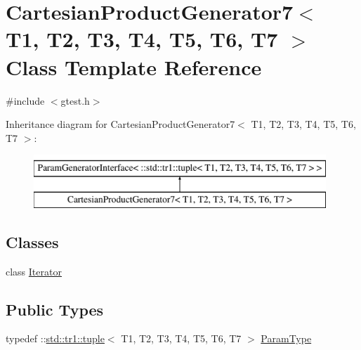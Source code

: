 \hypertarget{classtesting_1_1internal_1_1CartesianProductGenerator7}{\section{\-Cartesian\-Product\-Generator7$<$ \-T1, \-T2, \-T3, \-T4, \-T5, \-T6, \-T7 $>$ \-Class \-Template \-Reference}
\label{d1/d5a/classtesting_1_1internal_1_1CartesianProductGenerator7}
}


{\ttfamily \#include $<$gtest.\-h$>$}

\-Inheritance diagram for \-Cartesian\-Product\-Generator7$<$ \-T1, \-T2, \-T3, \-T4, \-T5, \-T6, \-T7 $>$\-:\begin{figure}[H]
\begin{center}
\leavevmode
\includegraphics[height=2.000000cm]{d1/d5a/classtesting_1_1internal_1_1CartesianProductGenerator7}
\end{center}
\end{figure}
\subsection*{\-Classes}
\begin{DoxyCompactItemize}
\item 
class \hyperlink{classtesting_1_1internal_1_1CartesianProductGenerator7_1_1Iterator}{\-Iterator}
\end{DoxyCompactItemize}
\subsection*{\-Public \-Types}
\begin{DoxyCompactItemize}
\item 
typedef \-::\hyperlink{classstd_1_1tr1_1_1tuple}{std\-::tr1\-::tuple}$<$ \-T1, \*
\-T2, \-T3, \-T4, \-T5, \-T6, \-T7 $>$ \hyperlink{classtesting_1_1internal_1_1CartesianProductGenerator7_a18469e04d44a379d754ff5044f09531f}{\-Param\-Type}
\end{DoxyCompactItemize}

